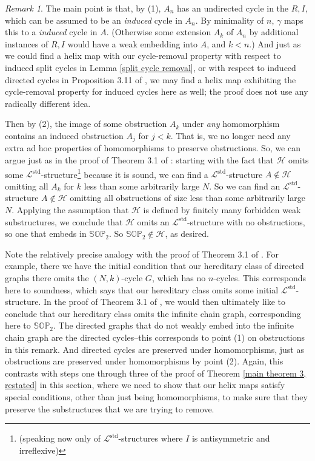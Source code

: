\documentclass{amsart}
\theoremstyle{definition}
\theoremstyle{remark}
\newtheorem{remark}[theorem]{Remark}
\numberwithin{equation}{section}
\begin{document}
\begin{remark}
The main point is that, by (1), $A_{n}$ has an undirected cycle in the $R, I$, which can be assumed to be an \textit{induced} cycle in $A_{n}$. By minimality of $n$, $\gamma$ maps this to a \textit{induced} cycle in $A$. (Otherwise some extension $A_{k}$ of $A_{n}$ by additional instances of $R, I$ would have a weak embedding into $A$, and $k < n$.) And just as we could find a helix map with our cycle-removal property with respect to induced split cycles in Lemma \ref{split cycle removal}, or with respect to induced directed cycles in Proposition 3.11 of \cite{ApproxOrder}, we may find a helix map exhibiting the cycle-removal property for induced cycles here as well; the proof does not use any radically different idea.

Then by (2), the image of some obstruction $A_{k}$ under \textit{any} homomorphism contains an induced obstruction $A_{j}$ for $j < k$. That is, we no longer need any extra ad hoc properties of homomorphisms to preserve obstructions. So, we can argue just as in the proof of Theorem 3.1 of \cite{ApproxOrder}: starting with the fact that $\mathcal{H}$ omits some $\mathcal{L}^{\mathrm{std}}$-structure\footnote{(speaking now only of $\mathcal{L}^{\mathrm{std}}$-structures where $I$ is antisymmetric and irreflexive)} because it is sound, we can find a $\mathcal{L}^{\mathrm{std}}$-structure $A \notin \mathcal{H}$ omitting  all $A_{k}$ for $k$ less than some arbitrarily large $N$. So  we can find an $\mathcal{L}^{\mathrm{std}}$-structure $A \notin \mathcal{H}$ omitting all obstructions of size less than some arbitrarily large $N$. Applying the assumption that $\mathcal{H}$ is defined by finitely many forbidden weak substructures, we conclude that $\mathcal{H}$ omits an $\mathcal{L}^{\mathrm{std}}$-structure with no obstructions, so one that embeds in $\mathbb{SOP}_{2}$. So $\mathbb{SOP}_{2} \notin \mathcal{H}$, as desired.


Note the relatively precise analogy with the proof of Theorem 3.1 of \cite{ApproxOrder}. For example, there we have the initial condition that our hereditary class of directed graphs there omits the $(N, k)$-cycle $G$, which has no $n$-cycles. This corresponds here to soundness, which says that our hereditary class omits some initial $\mathcal{L}^{\mathrm{std}}$-structure. In the proof of Theorem 3.1 of \cite{ApproxOrder}, we would then ultimately like to conclude that our hereditary class omits the infinite chain graph, corresponding here to $\mathbb{SOP}_{2}$. The directed graphs that do not weakly embed into the infinite chain graph are the directed cycles--this corresponds to point (1) on obstructions in this remark. And directed cycles are preserved under homomorphisms, just as obstructions are preserved under homomorphisms by point (2). Again, this contrasts with steps one through three of the proof of Theorem \ref{main theorem 3, restated} in this section, where we need to show that our helix maps satisfy special conditions, other than just being homomorphisms, to make sure that they preserve the substructures that we are trying to remove.





    
\end{remark}
\end{document}
